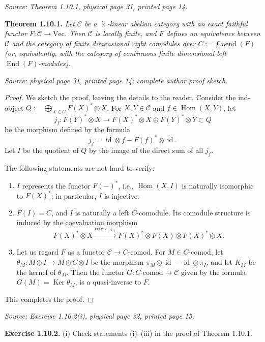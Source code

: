 \documentclass[11pt]{article}
\newcommand{\kk}{\Bbbk}
\newcommand{\cC}{\mathcal{C}}
\newcommand{\FiniteVec}{\mathrm{Vec}}
\newcommand{\Coend}{\operatorname{Coend}}
\newcommand{\End}{\operatorname{End}}
\newcommand{\Hom}{\operatorname{Hom}}
\newcommand{\Ker}{\operatorname{Ker}}
\newcommand{\id}{\operatorname{id}}
\newcommand{\comod}{\mathrm{comod}}
\newcommand{\sourceloc}[1]{\par\smallskip\noindent\textit{Source: #1.}\par\smallskip}
\begin{document}

\sourceloc{Theorem 1.10.1, physical page 31, printed page 14}
\noindent\textbf{Theorem 1.10.1.}
\emph{Let $\cC$ be a $\kk$-linear abelian category with an exact faithful
functor $F:\cC\to\FiniteVec$. Then $\cC$ is locally finite, and $F$ defines an
equivalence between $\cC$ and the category of finite dimensional right
comodules over $C:=\Coend(F)$ (or, equivalently, with the category of
continuous finite dimensional left $\End(F)$-modules).}

\sourceloc{physical page 31, printed page 14; complete author proof sketch}
\begin{proof}
We sketch the proof, leaving the details to the reader. Consider the
ind-object $Q:=\bigoplus_{X\in\cC}F(X)^*\otimes X$.
For $X,Y\in\cC$ and $f\in\Hom(X,Y)$, let
\[
j_f:F(Y)^*\otimes X\longrightarrow
F(X)^*\otimes X\oplus F(Y)^*\otimes Y\subset Q
\]
be the morphism defined by the formula
\[
j_f=\id\otimes f-F(f)^*\otimes\id.
\]
Let $I$ be the quotient of $Q$ by the image of the direct sum of all $j_f$.

The following statements are not hard to verify:
\begin{enumerate}
\item[(i)] $I$ represents the functor $F(-)^*$, i.e., $\Hom(X,I)$ is
  naturally isomorphic to $F(X)^*$; in particular, $I$ is injective.
\item[(ii)] $F(I)=C$, and $I$ is naturally a left $C$-comodule. Its comodule
  structure is induced by the coevaluation morphism
  \[
  F(X)^*\otimes X
  \xrightarrow{\operatorname{coev}_{F(X)}}
  F(X)^*\otimes F(X)\otimes F(X)^*\otimes X.
  \]
\item[(iii)] Let us regard $F$ as a functor $\cC\to C$-$\comod$.
  For $M\in C$-$\comod$, let
  $\theta_M:M\otimes I\to M\otimes C\otimes I$ be the morphism
  $\pi_M\otimes\id-\id\otimes\pi_I$, and let $K_M$ be the kernel of
  $\theta_M$. Then the functor $G:C$-$\comod\to\cC$ given by the formula
  $G(M)=\Ker\theta_M$, is a quasi-inverse to $F$.
\end{enumerate}
This completes the proof.
\end{proof}

\sourceloc{Exercise 1.10.2(i), physical page 32, printed page 15}
\noindent\textbf{Exercise 1.10.2.}
(i) Check statements (i)--(iii) in the proof of Theorem 1.10.1.
\end{document}

